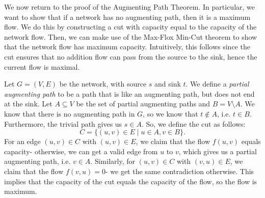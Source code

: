 \documentclass[a4paper, openany]{memoir}
\begin{document}

    We now return to the proof of the Augmenting Path Theorem. In particular, we want to show that if a network has no augmenting path, then it is a maximum flow. We do this by constructing a cut with capacity equal to the capacity of the network flow. Then, we can make use of the Max-Flox Min-Cut theorem  to show that the network flow has maximum capacity. Intuitively, this follows since the cut ensures that no addition flow can pass from the source to the sink, hence the current flow is maximal.

    Let $G = (V, E)$ be the network, with source $s$ and sink $t$. We define a \emph{partial augmenting path} to be a path that is like an augmenting path, but does not end at the sink. Let $A \subseteq V$ be the set of partial augmenting paths and $B = V \setminus A$. We know that there is no augmenting path in $G$, so we know that $t \not\in A$, i.e. $t \in B$. Furthermore, the trivial path gives us $s \in A$. So, we define the cut as follows:
    \[C = \{(u, v) \in E \mid u \in A, v \in B\}.\]
    For an edge $(u, v) \in C$ with $(u, v) \in E$, we claim that the flow $f(u, v)$ equals capacity- otherwise, we can get a valid edge from $u$ to $v$, which gives us a partial augmenting path, i.e. $v \in A$. Similarly, for $(u, v) \in C$ with $(v, u) \in E$, we claim that the flow $f(v, u) = 0$- we get the same contradiction otherwise. This implies that the capacity of the cut equals the capacity of the flow, so the flow is maximum. 
\end{document}
